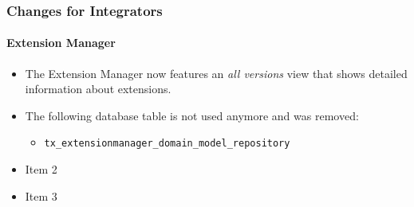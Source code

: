 %

\begin{frame}[fragile]
	\frametitle{Changes for Integrators}
	\framesubtitle{Extension Manager}

	\begin{itemize}
		\item The Extension Manager now features an \textit{all versions} view
			that shows detailed information about extensions.
		\item The following database table is not used anymore and was removed:
			\begin{itemize}\smaller
				\item \texttt{tx\_extensionmanager\_domain\_model\_repository}
			\end{itemize}\normalsize
			\vspace{0.4cm}

		\item Item 2
		\item Item 3
	\end{itemize}

\end{frame}

